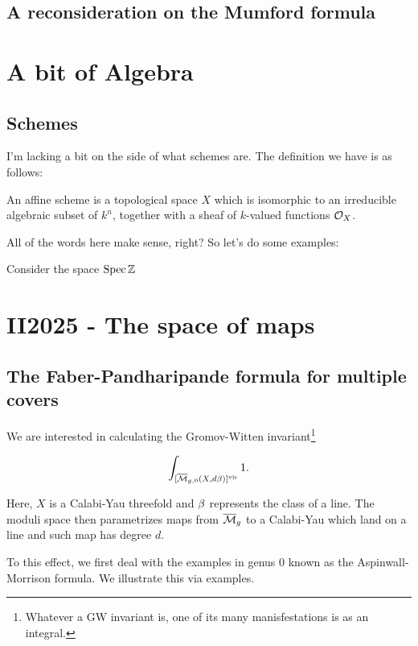 \documentclass[12pt]{memoir}
\begin{document}
\section{A reconsideration on the Mumford formula}

\chapter{A bit of Algebra}

\section{Schemes}

I'm lacking a bit on the side of what schemes are. The definition we have is as follows:

\begin{Def}
    An affine scheme is a topological space \(X\) which is isomorphic to an irreducible algebraic subset of \(k^n\), together with a sheaf of \(k\)-valued functions \(\mathcal{O}_X\).
\end{Def}

All of the words here make sense, right? So let's do some examples:

\begin{Ex}
    Consider the space \(\operatorname{Spec}\mathbb{Z}\)
\end{Ex}

\chapter{II2025 - The space of maps}

\section{The Faber-Pandharipande formula for multiple covers}

We are interested in calculating the Gromov-Witten invariant\footnote{Whatever a GW invariant is, one of its many manisfestations is as an integral.}

\[\int_{[\overline{\mathcal{M}}_{g,0}(X,d\beta)]^{\mathrm{vir}}}1.\]

Here, \(X\) is a Calabi-Yau threefold and \(\beta\) represents the class of a line. The moduli space then parametrizes maps from \(\overline{\mathcal{M}}_g\) to a Calabi-Yau which land on a line and such map has degree \(d\).\par
To this effect, we first deal with the examples in genus 0 known as the Aspinwall-Morrison formula. We illustrate this via examples.
\end{document}
